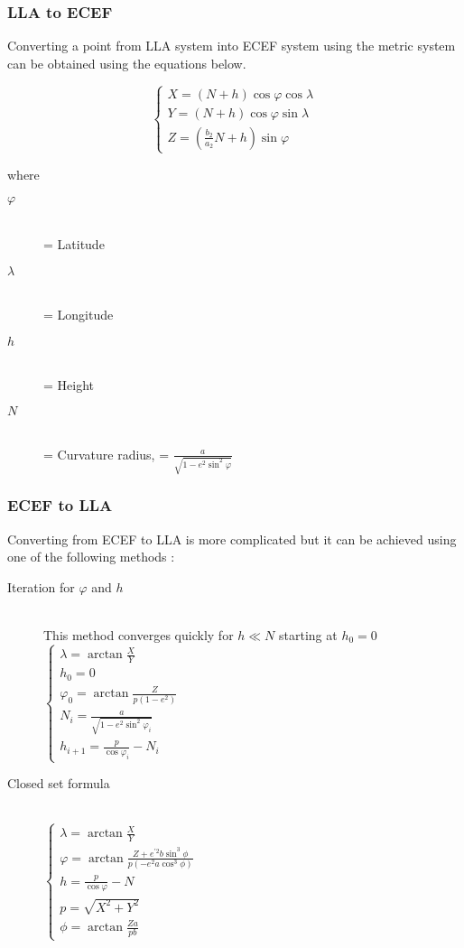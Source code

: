 \subsubsection{LLA to ECEF}
Converting a point from LLA system into ECEF system using the metric system can
be obtained using the equations below.

\begin{equation}
\begin{cases} 
X = (N+h)\cos \varphi \cos \lambda
\\ Y = (N+h)\cos \varphi \sin \lambda
\\ Z = (\frac{b_{2}}{a_{2}}N + h) \sin \varphi
\end{cases}
\end{equation}

where

\begin {description}
\item [$\varphi$] \hfill \\ = Latitude
\item [$\lambda$] \hfill \\= Longitude
\item [$h$] \hfill \\= Height
\item [$N$] \hfill \\= Curvature radius,  = $\frac{a}{\sqrt{1-e^{2} \sin^{2} \varphi}}$
\end{description}

\subsubsection{ECEF to LLA}
Converting from ECEF to LLA is more complicated but it can be achieved  using one
of the following methods \cite{datum}:

\begin{description}
\item [Iteration for $\varphi$ and $h$] \hfill \\
This method converges quickly for  $h \ll N$ starting at $h_{0}=0$
\newline
$
\begin{cases}
\lambda = \arctan \frac{X}{Y}
\\ h_{0} = 0
\\ \varphi_{0} = \arctan \frac{Z}{p(1-e^{2})}
\\ N_{i}  = \frac{a} {\sqrt{1-e^{2}\sin^{2} \varphi_{i}}}
\\ h_{i+1} = \frac{p}{\cos \varphi_{i}} - N_{i}
\end{cases}
$
\item [Closed set formula] \hfill \\
$
\begin{cases}
\lambda = \arctan \frac{X}{Y}
\\ \varphi = \arctan \frac{Z + e^{'2}b\sin^{3} \phi}{p(-e^{2}a\cos^3 \phi)}
\\ h = \frac{p}{\cos \varphi} - N
\\ p = \sqrt{X^{2} + Y^{2}}
\\ \phi = \arctan \frac{Za}{pb}
\end{cases}
$
\end{description}

